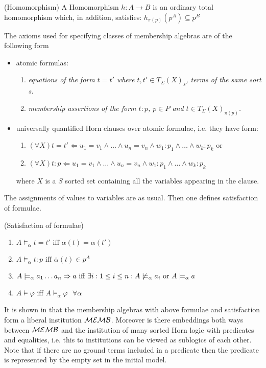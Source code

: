 \documentclass[10pt]{article}
\begin{document}
\begin{definition} (Homomorphism)
A Homomorphism $h:A \to B$ is an ordinary total homomorphism which, in
addition, satisfies: $h_{\pi(p)}(p^A) \subseteq p^B$
\end{definition}

\begin{definition}
The axioms used for specifying classes of membership algebras are of the following form
\begin{itemize}
\item atomic formulas:
	\begin{enumerate}
	\item \it{equations} of the form $t=t'$ where $t,t' \in T_\Sigma(X)_s$, terms of the same sort s.
	\item \it{membership assertions} of the form  $t:p$, $p \in P$ and $t \in T_\Sigma(X)_{\pi(p)}$.
	\end{enumerate}
\item universally quantified Horn clauses over atomic formulae, i.e. they have form:
	\begin{enumerate}
	\item $(\forall X) t=t' \Leftarrow u_1=v_1 \wedge \ldots \wedge u_n=v_n \wedge w_1:p_1 \wedge \ldots \wedge w_k:p_k$ or
	\item $(\forall X) t:p \Leftarrow u_1=v_1 \wedge \ldots \wedge u_n=v_n \wedge w_1:p_1 \wedge \ldots \wedge w_k:p_k$
	\end{enumerate}
where $X$ is a $S$ sorted set containing all the variables appearing in the clause.
\end{itemize}
\end{definition}
The assignments of values to variables are as usual. Then one defines
satisfaction of formulae.
\begin{definition}(Satisfaction of formulae)
\begin{enumerate}
\item $A \models_\alpha t = t' \mbox{ iff } \overline{\alpha}(t) =\overline{\alpha}(t')$
\item $A \models_\alpha t:p \mbox{ iff } \overline{\alpha}(t) \in p^A$ %
\item $ A \models_\alpha a_1 \ldots a_n \Rightarrow a \mbox{ iff } \exists i: 1 \leq i \leq n : A \not\models_\alpha a_i \mbox{ or }  A \models_\alpha a$
\item $A \models \varphi \mbox{ iff } A \models_\alpha \varphi \mbox{ } \forall \alpha$
\end{enumerate}
\end{definition}
%
It is shown in \cite{member} that the membership algebras with above formulae
and satisfaction form a liberal
institution ${\mathcal{MEMB}}$. Moreover is there embeddings both ways between ${\mathcal{MEMB}}$ and the institution of many sorted Horn logic with predicates and equalities, i.e. this to institutions can be viewed as sublogics of each other. Note that if there are no ground terms included in a
predicate then the predicate is represented by the empty set in the initial
model.
\end{document}
